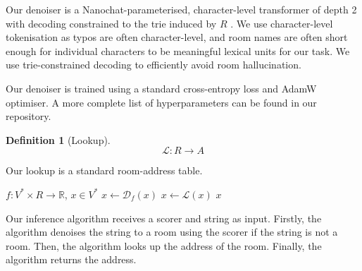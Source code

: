 \documentclass{article}
\theoremstyle{definition}
\newtheorem{definition}{Definition}
\newcommand{\R}{\mathbb{R}}
\begin{document}
Our denoiser is a Nanochat-parameterised, character-level transformer of depth 2 with decoding constrained to the trie induced by $R$
\citep{nanochat}.
We use character-level tokenisation as typos are often character-level, and room names are often short enough for individual characters to be meaningful lexical units for our task.
We use trie-constrained decoding to efficiently avoid room hallucination.

Our denoiser is trained using a standard cross-entropy loss and AdamW optimiser.
A more complete list of hyperparameters can be found in our repository.

\begin{definition}[Lookup]
$$
	\mathscr{L}:R\to A
$$
\end{definition}

Our lookup is a standard room-address table.



\begin{algorithm}[H]
	\caption{$\textsc{Infer}(f,x)$}
	\begin{algorithmic}
		\Require $f:V^{*}\times R\to\R$, $x\in V^{*}$
			$x\gets\mathscr{D}_{f}(x)$
		\EndIf
		\State $x\gets\mathscr{L}(x)$
		\State \Return $x$
	\end{algorithmic}
\end{algorithm}

Our inference algorithm receives a scorer and string as input.
Firstly, the algorithm denoises the string to a room using the scorer if the string is not a room.
Then, the algorithm looks up the address of the room.
Finally, the algorithm returns the address.

\newpage
\end{document}
